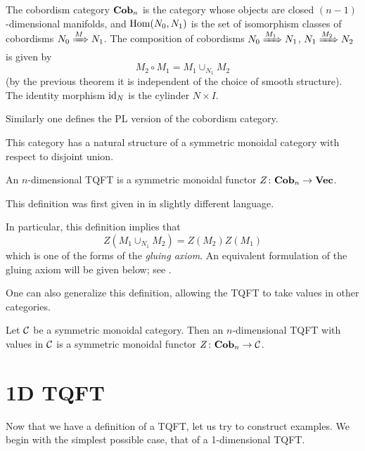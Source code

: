 \begin{definition}\label{d:ncob}
  The cobordism category $\mathbf{Cob}_n$ is the category whose objects are closed
  $(n-1)$-dimensional manifolds, and $\operatorname{Hom}(N_0, N_1)$ is the set of
  isomorphism classes of cobordisms $N_0\xRightarrow{M}N_1$. The composition of
  cobordisms $N_0\xRightarrow{M_1}N_1$, $N_1\xRightarrow{M_2}N_2$
  is given by
  $$
    M_2\circ M_1 = M_1\cup_{N_1} M_2
  $$
  (by the previous theorem it is independent of the choice of smooth structure).
  The identity morphism $\operatorname{id}_N$ is the cylinder $N\times I$.
\end{definition}
Similarly one defines the PL version of the cobordism category.

This category has a natural structure of a symmetric monoidal
category with respect to disjoint union.

\begin{definition}\label{d:tqft}
  An $n$-dimensional TQFT is a symmetric
  monoidal functor $Z\colon \mathbf{Cob}_n\to \mathbf{Vec}$.
\end{definition}
This definition was first given in  in slightly different
language.

In particular, this definition implies that
\begin{equation}\label{e:tqft-gluing0}
  Z( M_1\cup_{N_1} M_2) = Z(M_2) Z(M_1)
\end{equation}
which is one of the forms of the \emph{gluing axiom}.
An equivalent formulation of the gluing axiom will be given below; see
.


One can also generalize this definition, allowing the TQFT to take values in
other categories.

\begin{definition}\label{d:tqft-c}
  Let $\mathcal{C}$ be a symmetric monoidal category. Then an
  $n$-dimensional TQFT with values in $\mathcal{C}$ is a symmetric
    monoidal functor $Z\colon \mathbf{Cob}_n\to \mathcal{C}$.
\end{definition}
\section{1D TQFT}\label{s:1d-tqft}

Now that we have a definition of a TQFT, let us try to construct examples. We
begin with the simplest possible case, that of a 1-dimensional TQFT.

